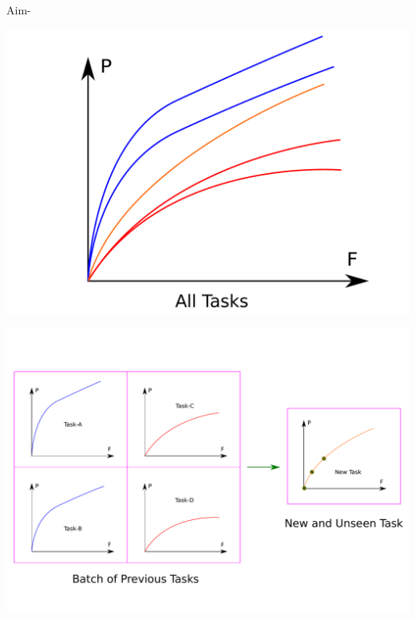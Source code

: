 \begin{frame}{Aim-}
{\begin{minipage}{0.3\textwidth}
    \includegraphics[width=\textwidth]{Figures/problem/collective.pdf}
  \end{minipage}%
  \begin{minipage}{0.7\textwidth} 
    \centering
    \includegraphics[width=\textwidth]{Figures/problem/material.pdf}
  \end{minipage}
}
\end{frame}

